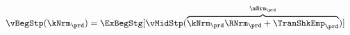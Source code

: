   \begin{equation}\begin{gathered}\begin{aligned}
        \vBegStp(\kNrm_{\prd}) & = \ExBegStg[\vMidStp(\overbrace{\kNrm_{\prd} \RNrm_{\prd} + \TranShkEmp_{\prd}}^{\mNrm_{\prd}})]  \label{eq:vBegStp}
      \end{aligned}\end{gathered}\end{equation}
